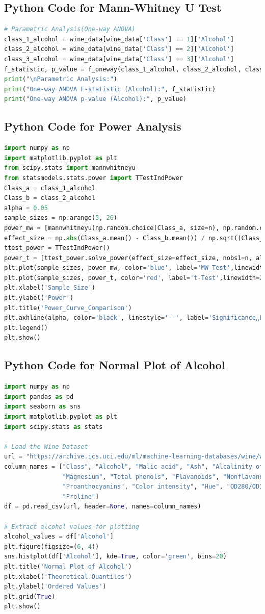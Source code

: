 \documentclass{article}
\begin{document}
\subsection{Python Code for Mann-Whitney U Test}
\begin{lstlisting}[language=Python]
# Parametric Analysis(One-way ANOVA)
class_1_alcohol = wine_data[wine_data['Class'] == 1]['Alcohol']
class_2_alcohol = wine_data[wine_data['Class'] == 2]['Alcohol']
class_3_alcohol = wine_data[wine_data['Class'] == 3]['Alcohol']
f_statistic, p_value = f_oneway(class_1_alcohol, class_2_alcohol, class_3_alcohol)
print("\nParametric Analysis:")
print("One-way ANOVA F-statistic (Alcohol):", f_statistic)
print("One-way ANOVA p-value (Alcohol):", p_value)
\end{lstlisting}
\subsection{Python Code for Power Analysis}
\begin{lstlisting}[language=Python]
import numpy as np
import matplotlib.pyplot as plt
from scipy.stats import mannwhitneyu
from statsmodels.stats.power import TTestIndPower
Class_a = class_1_alcohol
Class_b = class_2_alcohol
alpha = 0.05
sample_sizes = np.arange(5, 26)
power_mw = [mannwhitneyu(np.random.choice(Class_a, size=n), np.random.choice(Class_b, size=n))[1] for n in sample_sizes]
effect_size = np.abs(Class_a.mean() - Class_b.mean()) / np.sqrt((Class_a.var() + Class_b.var()) / 2)
ttest_power = TTestIndPower()
power_t = [ttest_power.solve_power(effect_size=effect_size, nobs1=n, alpha=alpha, alternative='two-sided') for n in sample_sizes]
plt.plot(sample_sizes, power_mw, color='blue', label='MW_Test',linewidth=2)
plt.plot(sample_sizes, power_t, color='red', label='t-Test',linewidth=2)
plt.xlabel('Sample_Size')
plt.ylabel('Power')
plt.title('Power_Curve_Comparison')
plt.axhline(alpha, color='black', linestyle='--', label='Significance␣Level')
plt.legend()
plt.show()
\end{lstlisting}
\newpage
\subsection{Python Code for Normal Plot of Alcohol}
\begin{lstlisting}[language=Python]
import numpy as np
import pandas as pd
import seaborn as sns
import matplotlib.pyplot as plt
import scipy.stats as stats

# Load the Wine Dataset
url = "https://archive.ics.uci.edu/ml/machine-learning-databases/wine/wine.data"
column_names = ["Class", "Alcohol", "Malic acid", "Ash", "Alcalinity of ash", 
                "Magnesium", "Total phenols", "Flavanoids", "Nonflavanoid phenols", 
                "Proanthocyanins", "Color intensity", "Hue", "OD280/OD315 of diluted wines", 
                "Proline"]
df = pd.read_csv(url, header=None, names=column_names)

# Extract alcohol values for plotting
alcohol_values = df['Alcohol']
plt.figure(figsize=(6, 4))
sns.histplot(df['Alcohol'], kde=True, color='green', bins=20)
plt.title('Normal Plot of Alcohol')
plt.xlabel('Theoretical Quantiles')
plt.ylabel('Ordered Values')
plt.grid(True)
plt.show()
\end{lstlisting}
\end{document}
